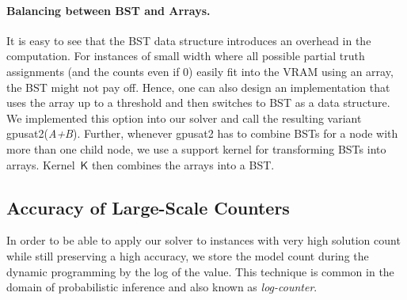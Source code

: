 \documentclass{llncs}
\newcommand{\gpusatnu}{{\small\textsf{gpusat2}}\xspace}
\newcommand{\gpusatnuv}[1]{{\small\textsf{gpusat2({\textit{#1}})}}\xspace}
\newcommand{\algo}[1]{\ensuremath{\mathsf{#1}}}
\begin{document}
\paragraph{Balancing between BST and Arrays.}
It is easy to see that the BST data structure introduces an overhead
in the computation. For instances of small width where all
possible partial truth assignments (and the counts even if 0) easily
fit into the VRAM using an array, the BST might not pay off.
%
Hence, one can also design an implementation that uses the array up to
a threshold and then switches to BST as a data structure. We
implemented this option into our solver and call the resulting variant
\gpusatnuv{A+B}.
Further, whenever \gpusatnu{} has to combine BSTs %
for a node with more than one child node, we use a support kernel
for transforming BSTs into arrays. Kernel~\algo{K} then combines the arrays into a BST.
%
%



%
%
%
%
%
%
%
%
%
%
%
%
%
%
%
%
%


\subsection{Accuracy of Large-Scale Counters}
In order to be able to apply our solver to instances with very high
solution count while still preserving a high accuracy, we store the
model count during the dynamic programming by the log of the value.
%
This technique is common in the domain of probabilistic inference and
also known as \emph{log-counter}.
\end{document}
